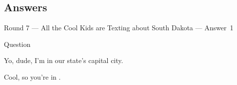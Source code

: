 \documentclass[11pt]{beamer}
\begin{document}
\subsection{Answers}
\begin{frame}[t]{Round 7 --- All the Cool Kids are Texting about South Dakota --- \mbox{Answer 1}}
\begin{block}{Question}

\begin{minipage}{0.9\textwidth}
\begin{mdframed}[
    roundcorner=7pt,
    backgroundcolor=black!5,
    linecolor=black!5,
    fontcolor=black,
    ignorelastdescenders]
\begin{flushleft}
{\small{}\selectfont{}
Yo, dude, I'm in our state's capital city.
}
\end{flushleft}
\end{mdframed}
\end{minipage}

\hfill{}\begin{minipage}{0.9\textwidth}
\begin{mdframed}[
    roundcorner=7pt,
    backgroundcolor=blue!80!white,
    linecolor=blue!80!white,
    fontcolor=white,
    ignorelastdescenders]
\begin{flushleft}
{\small{}\selectfont{}
Cool, so you're in \textunderscore{}\textunderscore{}\textunderscore{}\textunderscore{}\textunderscore{}\textunderscore{}.
}
\end{flushleft}
\end{mdframed}
\end{minipage}
\end{block}
\end{frame}
\end{document}
